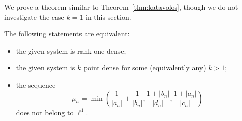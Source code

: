   We prove a theorem similar to Theorem~\ref{thm:katavolos}, though we do not investigate the case $k = 1$ in this section.
    \begin{theorem}
      The following statements are equivalent:
      \begin{itemize}
        \item the given system is rank one dense;
        \item the given system is $k$ point dense for some (equivalently any) $k > 1$;
        \item the sequence
          \[
            \mu_n = \min\left(\frac{1}{\lvert a_n \rvert} + \frac{1}{\lvert b_n \rvert}, \frac{1 + \lvert b_n\rvert}{\lvert d_n\rvert},
                    \frac{1 + \lvert a_n\rvert}{\lvert c_n\rvert}\right)
          \]
        does not belong to $\ell^1$.
      \end{itemize}
    \end{theorem}
